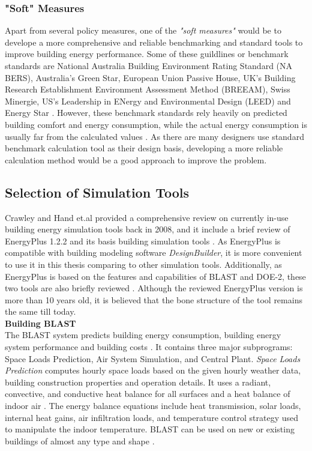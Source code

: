 \documentclass[11pt, a4paper]{article}
\theoremstyle{definition}
\begin{document}
		\subsubsection{"Soft" Measures}
			Apart from several policy measures, one of the \textit{"soft measures"} would be to develope a more comprehensive and reliable benchmarking and standard tools to improve building energy performance. Some of these guildlines or benchmark standards are National Australia Building Environment Rating Standard (NA BERS), Australia's Green Star, European Union Passive House, UK's Building Research Establishment Environment Assessment Method (BREEAM), Swiss Minergie, US's Leadership in ENergy and Environmental Design (LEED) and Energy Star \cite{ZOU2018165}. However, these benchmark standards rely heavily on predicted building comfort and energy consumption, while the actual energy consumption is usually far from the calculated values \cite{tuohy2015closing}. As there are many designers use standard benchmark calculation tool as their design basis, developing a more reliable calculation method would be a good approach to improve the problem.


	\subsection{Selection of Simulation Tools}
		Crawley and Hand et.al provided a comprehensive review on currently in-use building energy simulation tools back in 2008, and it include a brief review of EnergyPlus 1.2.2 and its basis building simulation tools \cite{crawley2008contrasting}. As EnergyPlus is compatible with building modeling software \textit{DesignBuilder}, it is more convenient to use it in this thesis comparing to other simulation tools. Additionally, as EnergyPlus is based on the features and capabilities of BLAST and DOE-2, these two tools are also briefly reviewed \cite{crawley2008contrasting}. Although the reviewed EnergyPlus version is more than 10 years old, it is believed that the bone structure of the tool remains the same till today.\\

		\textbf{Building BLAST}\\
			The BLAST system predicts building energy consumption, building energy system performance and building costs \cite{crawley2008contrasting}. It contains three major subprograms: Space Loads Prediction, Air System Simulation, and Central Plant. \textit{Space Loads Prediction} computes hourly space loads based on the given hourly weather data, building construction properties and operation details. It uses a radiant, convective, and conductive heat balance for all surfaces and a heat balance of indoor air \cite{crawley2008contrasting}. The energy balance equations include heat transmission, solar loads, internal heat gains, air infiltration loads, and temperature control strategy used to manipulate the indoor temperature. BLAST can be used on new or existing buildings of almost any type and shape \cite{crawley2008contrasting}.\\
\end{document}
